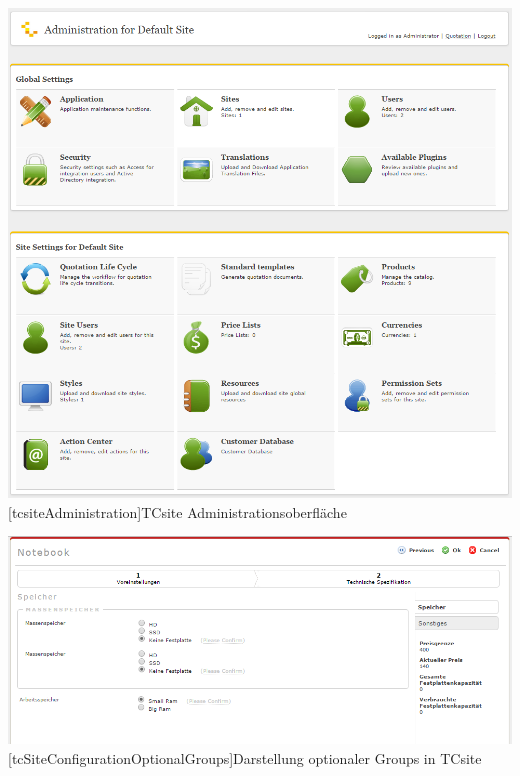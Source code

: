 \begin{appendix}
\vspace{1em}
\begin{minipage}{\linewidth}
	\centering
	\includegraphics[width=1\linewidth]{Abbildungen/tcsiteAdministration.PNG}
	[tcsiteAdministration]{TCsite Administrationsoberfläche}
	\label{app:tcsiteAdministration}
\end{minipage}
\vspace{1em}

\vspace{1em}
\begin{minipage}{\linewidth}
	\centering
	\includegraphics[width=1\linewidth]{Abbildungen/tcSiteConfigurationOptionalGroups.PNG}
	[tcSiteConfigurationOptionalGroups]{Darstellung optionaler Groups in TCsite}
	\label{app:tcSiteConfigurationOptionalGroups}
\end{minipage}
\vspace{1em}


\end{appendix}
